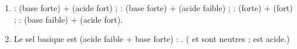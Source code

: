 \documentclass[11pt,a4paper]{article}
\begin{document}
\begin{corrige}
\begin{enumerate}[label=\alph*)]
  \item {} :  (base forte) +  (acide fort) ;\quad
         :  (base forte) +  (acide faible) ;\quad
         :  (forte) +  (fort) ;\quad
         :  (base faible) +  (acide fort).
  \item Le sel basique est \textbf{} (acide faible + base forte) : .
        ( et  sont neutres ;  est acide.)
\end{enumerate}
\end{corrige}
\end{document}
